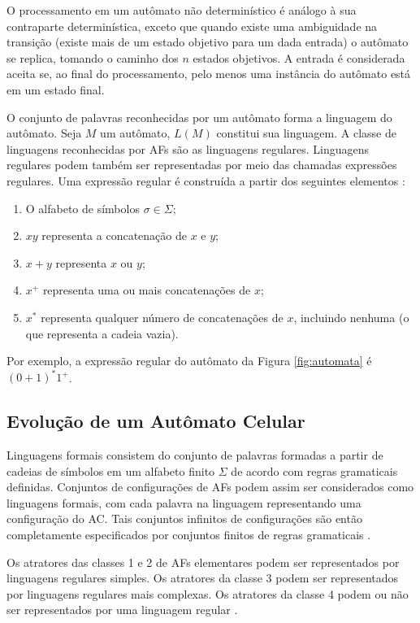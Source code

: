 \documentclass[12pt,a4paper]{article}
\begin{document}
O processamento em um autômato não determinístico é análogo à sua contraparte
determinística, exceto que quando existe uma ambiguidade na transição (existe
mais de um estado objetivo para um dada entrada) o autômato se replica, tomando
o caminho dos $n$ estados objetivos. A entrada é considerada aceita se, ao
final do processamento, pelo menos uma instância do autômato está em um
estado final.

O conjunto de palavras reconhecidas por um autômato forma a linguagem do
autômato. Seja $M$ um autômato, $L(M)$ constitui sua linguagem. A classe
de linguagens reconhecidas por AFs são as linguagens regulares.
Linguagens regulares podem também ser representadas por meio das chamadas
expressões regulares. Uma expressão regular é construída a partir dos
seguintes elementos :

\begin{enumerate}
\item O alfabeto de símbolos $\sigma \in \Sigma$;
\item $xy$ representa a concatenação de $x$ e $y$;
\item $x+y$ representa $x$ ou $y$;
\item $x^+$ representa uma ou mais concatenações de $x$;
\item $x^*$ representa qualquer número de concatenações de $x$, incluindo
nenhuma (o que representa a cadeia vazia).
\end{enumerate}

Por exemplo, a expressão regular do autômato da Figura \ref{fig:automata}
é $(0+1)^*1^+$.

\subsection{Evolução de um Autômato Celular}

Linguagens formais consistem do conjunto de palavras formadas a partir de
cadeias de símbolos em um alfabeto finito $\Sigma$ de acordo com regras
gramaticais definidas. Conjuntos de configurações de AFs
podem assim ser considerados como linguagens formais, com cada palavra na
linguagem representando uma configuração do AC. Tais conjuntos
infinitos de configurações são então completamente especificados por
conjuntos finitos de regras gramaticais .

Os atratores das classes 1 e 2 de AFs elementares podem ser
representados por linguagens regulares simples. Os atratores da classe 3 podem
ser representados por linguagens regulares mais complexas. Os atratores da
classe 4 podem ou não ser representados por uma linguagem regular .
\end{document}
